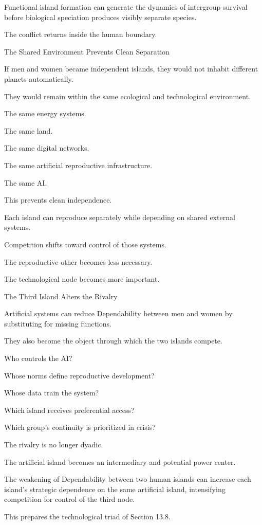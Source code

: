 Functional island formation can generate the dynamics of intergroup survival before biological speciation produces visibly separate species.

The conflict returns inside the human boundary.

The Shared Environment Prevents Clean Separation

If men and women became independent islands, they would not inhabit different planets automatically.

They would remain within the same ecological and technological environment.

The same energy systems.

The same land.

The same digital networks.

The same artificial reproductive infrastructure.

The same AI.

This prevents clean independence.

Each island can reproduce separately while depending on shared external systems.

Competition shifts toward control of those systems.

The reproductive other becomes less necessary.

The technological node becomes more important.

The Third Island Alters the Rivalry

Artificial systems can reduce Dependability between men and women by substituting for missing functions.

They also become the object through which the two islands compete.

Who controls the AI?

Whose norms define reproductive development?

Whose data train the system?

Which island receives preferential access?

Which group’s continuity is prioritized in crisis?

The rivalry is no longer dyadic.

The artificial island becomes an intermediary and potential power center.

The weakening of Dependability between two human islands can increase each island’s strategic dependence on the same artificial island, intensifying competition for control of the third node.

This prepares the technological triad of Section 13.8.

